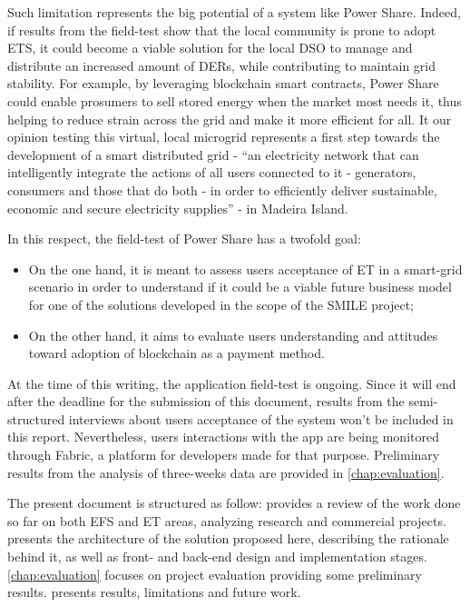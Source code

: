 Such limitation represents the big potential of a system like Power Share. Indeed, if results from the field-test show that the local community is prone to adopt \ac{ETS}, it could become a viable solution for the local \ac{DSO} to manage and distribute an increased amount of \acp{DER}, while contributing to maintain grid stability. For example, by leveraging blockchain smart contracts, Power Share could enable prosumers to sell stored energy when the market most needs it, thus helping to reduce strain across the grid and make it more efficient for all.
It our opinion testing this virtual, local microgrid represents a first step towards the development of a smart distributed grid -  “an electricity network that can intelligently integrate the actions of all users connected to it - generators, consumers and those that do both - in order to efficiently deliver sustainable, economic and secure electricity supplies” \cite{OverviewSmartGrid} - in Madeira Island.


In this respect, the field-test of Power Share has a twofold goal:

\begin{itemize}
    \item On the one hand, it is meant to assess users acceptance of \ac{ET} in a smart-grid scenario in order to understand if it could be a viable future business model  for one of the solutions developed in the scope of the SMILE project;
\item On the other hand, it aims to evaluate users understanding  and attitudes toward adoption of blockchain as a payment method.
\end{itemize}


At the time of this writing, the application field-test is ongoing. Since it will end after the deadline for the submission of this document, results from the semi-structured interviews about users acceptance of the system won’t be included in this report. Nevertheless, users interactions with the app are being monitored through Fabric, a platform for developers made for that purpose. Preliminary results from the analysis of three-weeks data are provided in \cref{chap:evaluation}.

The present document is structured as follow:  provides a review of the work done so far on both \ac{EFS} and \ac{ET} areas, analyzing research and commercial projects.  presents the architecture of the solution proposed here, describing the rationale behind it, as well as front- and back-end design and implementation stages.
\cref{chap:evaluation} focuses on project evaluation providing some preliminary results.  presents results, limitations and future work.


